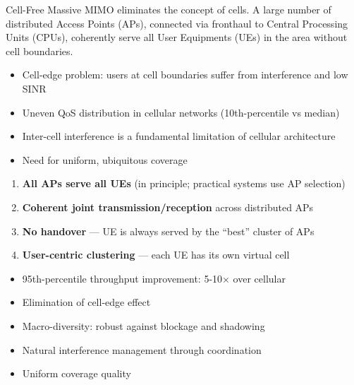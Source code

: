 

\CNchained{}

\CNchained{}

Cell-Free Massive MIMO eliminates the concept of cells. A large number of distributed Access Points (APs), connected via fronthaul to Central Processing Units (CPUs), coherently serve all User Equipments (UEs) in the area without cell boundaries.


\begin{itemize}
\tightlist
\item
  Cell-edge problem: users at cell boundaries suffer from interference and low SINR
\item
  Uneven QoS distribution in cellular networks (10th-percentile vs median)
\item
  Inter-cell interference is a fundamental limitation of cellular architecture
\item
  Need for uniform, ubiquitous coverage
\end{itemize}





\begin{enumerate}
\def\labelenumi{\arabic{enumi}.}
\tightlist
\item
  \textbf{All APs serve all UEs} (in principle; practical systems use AP selection)
\item
  \textbf{Coherent joint transmission/\allowbreak{}reception} across distributed APs
\item
  \textbf{No handover} — UE is always served by the ``best'' cluster of APs
\item
  \textbf{User-centric clustering} — each UE has its own virtual cell
\end{enumerate}


\begin{itemize}
\tightlist
\item
  95th-percentile throughput improvement: 5-10\ensuremath{\times} over cellular
\item
  Elimination of cell-edge effect
\item
  Macro-diversity: robust against blockage and shadowing
\item
  Natural interference management through coordination
\item
  Uniform coverage quality
\end{itemize}

